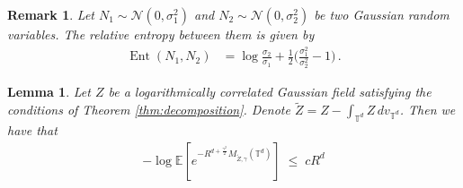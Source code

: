 \documentclass[11pt]{article}
\numberwithin{equation}{section}
\newtheorem{lemma}[theorem]{Lemma}
\newtheorem{remark}[theorem]{Remark}
\theoremstyle{definition}
\renewcommand{\tilde}{\widetilde}          %
\renewcommand{\leq}{\;\leqslant\;}                   %
\newcommand{\R}{\mathbb{R}}
\newcommand{\E}{\mathbb{E}}
\def\T{\mathbb{T}}
\newcommand{\opn}{\operatorname}
\begin{document}
  \begin{remark}
  Let $N_1 \sim \mathcal{N}(0,\sigma_1^2)$ and $N_2 \sim \mathcal{N}(0,\sigma_2^2)$ be two Gaussian random variables. The relative entropy between them is given by
  \begin{align}\label{eq:entropy_of_gauss}
  \opn{Ent}(N_1,N_2) &= \log \frac{\sigma_2}{\sigma_1} + \frac{1}{2} \big( \frac{\sigma_1^2}{\sigma_2^2} - 1 \big)\,.
  \end{align}
  
  \end{remark}
	\begin{lemma}\label{lem:dv_bound}
	Let $Z$ be a logarithmically correlated Gaussian field satisfying the conditions of Theorem \ref{thm:decomposition}. Denote $\tilde Z = Z - \int_{\T^d} Z \, dv_{\T^d}$. Then we have that 
	\begin{align}\label{eq:dv_ub}
- \log \E [ e^{- R^{d + \frac{\gamma^2}{2}} M_{\tilde Z,\gamma}(\T^d)} ] \leq c R^d
\end{align}
	\end{lemma}
\end{document}
